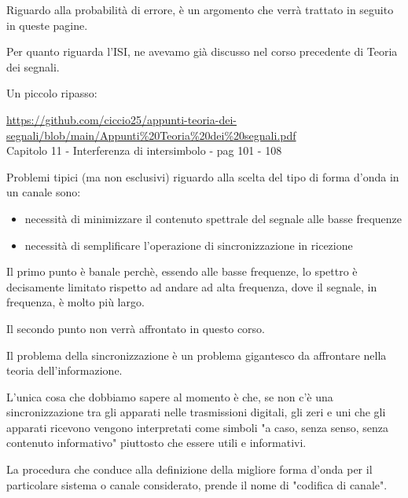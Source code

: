 \begin{tcolorbox}
    Riguardo alla probabilità di errore, è un argomento che verrà trattato in seguito in queste pagine. \newline 

    Per quanto riguarda l'ISI, ne avevamo già discusso nel corso precedente di Teoria dei segnali. \newline 

    Un piccolo ripasso: \newline 

     \url{https://github.com/ciccio25/appunti-teoria-dei-segnali/blob/main/Appunti%20Teoria%20dei%20segnali.pdf} \\
    Capitolo 11 - Interferenza di intersimbolo - pag 101 - 108
\end{tcolorbox}

Problemi tipici (ma non esclusivi) riguardo alla scelta del tipo di forma d'onda in un canale sono: 

\begin{itemize}
    \item necessità di minimizzare il contenuto spettrale del segnale alle basse frequenze 
    \item necessità di semplificare l'operazione di sincronizzazione in ricezione
\end{itemize}

\begin{tcolorbox}
    Il primo punto è banale perchè, essendo alle basse frequenze, lo spettro è decisamente limitato rispetto ad andare ad alta frequenza, dove il segnale, in frequenza, è molto più largo. \newline 

    Il secondo punto non verrà affrontato in questo corso. \newline 

    Il problema della sincronizzazione è un problema gigantesco da affrontare nella teoria dell'informazione. \newline 

    L'unica cosa che dobbiamo sapere al momento è che, se non c'è una sincronizzazione tra gli apparati nelle trasmissioni digitali, 
    gli zeri e uni che gli apparati ricevono vengono interpretati come simboli "a caso, senza senso, senza contenuto informativo" piuttosto che essere utili e informativi. 
\end{tcolorbox}


La procedura che conduce alla definizione della migliore forma d'onda per il particolare sistema o canale considerato, 
prende il nome di "codifica di canale". \newline 

